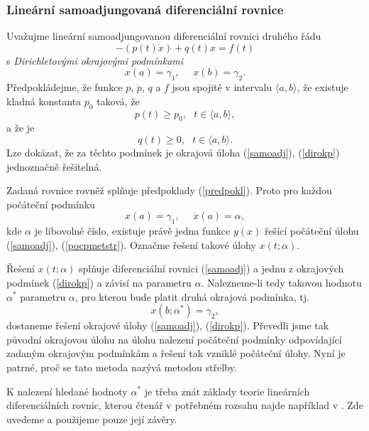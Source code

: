 \documentclass[a4paper, 12pt]{book}
\theoremstyle{definition}
\begin{document}
\subsubsection{Lineární samoadjungovaná diferenciální rovnice}
Uvažujme lineární samoadjungovanou diferenciální rovnici druhého řádu
\begin{equation}\label{samoadj}
-(p(t)\dot x)\dot{}+q(t)x=f(t)
\end{equation}
s {\em Dirichletovými okrajovými podmínkami}
\begin{equation}\label{dirokp}
x(a) = \gamma_1,~~~~~~ x(b)=\gamma_2.
\end{equation}
Předpokládejme, že funkce $p$, $\dot p$, $q$ a $f$ jsou spojité v intervalu 
$\langle a,b\rangle$, že existuje kladná konstanta $p_0$ taková, že
\begin{displaymath}
p(t)\geq p_0, ~~~ t\in\langle a,b\rangle,
\end{displaymath}
a že je 
\begin{displaymath}
q(t)\geq 0, ~~~ t\in\langle a,b\rangle.
\end{displaymath}
Lze dokázat, že za těchto podmínek je okrajová úloha (\ref{samoadj}), 
(\ref{dirokp}) jednoznačně řešitelná.

Zadaná rovnice rovněž splňuje předpoklady (\ref{predpokl}). Proto pro
každou počáteční podmínku
\begin{equation}\label{pocpmetstr}
x(a) = \gamma_1,~~~~~~ \dot x(a)=\alpha,
\end{equation}
kde $\alpha$ je libovolné číslo, existuje právě jedna funkce $y(x)$ 
řešící počáteční úlohu (\ref{samoadj}), (\ref{pocpmetstr}). Označme 
řešení takové úlohy $x(t;\alpha)$.

Řešení $x(t;\alpha)$ splňuje diferenciální rovnici (\ref{samoadj})
a jednu z okrajových podmínek (\ref{dirokp}) a závisí na parametru 
$\alpha$. Nalezneme-li tedy takovou hodnotu $\alpha^*$ parametru
$\alpha$, pro kterou bude platit druhá okrajová podmínka, tj. 
\begin{equation}\label{okpmetstr}
x(b;\alpha^*) = \gamma_2,
\end{equation}
dostaneme řešení okrajové úlohy (\ref{samoadj}), (\ref{dirokp}).
Převedli jsme tak původní okrajovou úlohu na úlohu nalezení 
počáteční podmínky odpovídající zadaným okrajovým podmínkám a řešení
tak vzniklé počáteční úlohy. Nyní je patrné, proč se tato metoda nazývá
metodou střelby.

K nalezení hledané hodnoty $\alpha^*$ je třeba znát základy teorie 
lineárních diferenciálních rovnic, kterou čtenář v potřebném rozsahu najde
například v \cite{Nagy}. Zde uvedeme a použijeme pouze její závěry.
\end{document}
